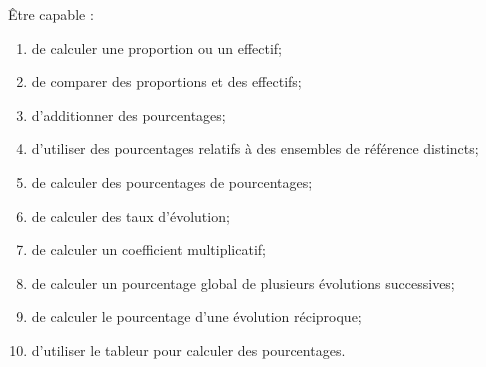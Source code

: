 \begin{myobj}
	Être capable : 
\begin{enumerate}
	\item de calculer une proportion ou un effectif;
	\item de comparer des proportions et des effectifs;
	\item d'additionner des pourcentages;
	\item d'utiliser des pourcentages relatifs à des ensembles de référence distincts;
	\item de calculer des pourcentages de pourcentages;
	\item de calculer des taux d'évolution;
	\item de calculer un coefficient multiplicatif;
	\item de calculer un pourcentage global de plusieurs évolutions successives;
	\item de calculer le pourcentage d'une évolution réciproque;
	\item d'utiliser le tableur pour calculer des pourcentages.
\end{enumerate}
\end{myobj}